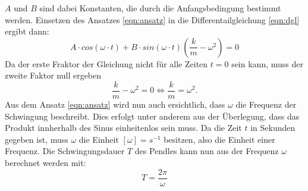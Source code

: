 $A$ und $B$ sind dabei Konstanten, die durch die Anfangsbedingung bestimmt werden. Einsetzen des Ansatzes \eqref{eqn:ansatz}
in die Differentailgleichung \eqref{eqn:dgl} ergibt dann:
\begin{equation}
    A\cdot cos(\omega\cdot t)+B\cdot sin(\omega\cdot t)(\frac{k}{m}-\omega^2)=0
\end{equation}
Da der erste Fraktor der Gleichung nicht für alle Zeiten $t=0$ sein kann, muss der zweite Faktor null ergeben
\begin{equation}
    \frac{k}{m}-\omega^2=0 \Leftrightarrow \frac{k}{m}=\omega^2 .
\end{equation}
Aus dem Ansatz \eqref{eqn:ansatz} wird nun auch ersichtlich, dass $\omega$ die Frequenz der Schwingung beschreibt. Dies erfolgt 
unter anderem aus der Überlegung, dass das Produkt innherhalb des Sinus einheitenlos sein muss. Da die Zeit $t$ in Sekunden gegeben
ist, muss $\omega$ die Einheit $[\omega]=s^{-1}$ besitzen, also die Einheit einer Frequenz.
Die Schwingungsdauer $T$ des Pendles kann nun aus der Frequenz $\omega$ berechnet werden mit:
\begin{equation}
    T=\frac{2\pi}{\omega}
\end{equation}


